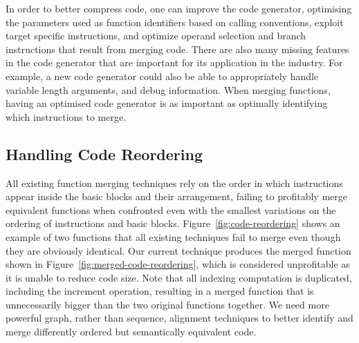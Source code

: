 
In order to better compress code, one can improve the code generator, optimising the parameters used as function identifiers based on calling conventions, exploit target specific instructions, and optimize operand selection and branch instructions that result from merging code.
There are also many missing features in the code generator that are important for its application in the industry.
For example, a new code generator could also be able to appropriately handle variable length arguments, and debug information.
When merging functions, having an optimised code generator is as important as optimally identifying which instructions to merge.

\subsection{Handling Code Reordering}

All existing function merging techniques rely on the order in which instructions appear inside the basic blocks and their arrangement,
failing to profitably merge equivalent functions when confronted even with the smallest variations on the ordering of instructions and basic blocks.
Figure~\ref{fig:code-reordering} shows an example of two functions that all existing techniques fail to merge even though they are obviously identical.
Our current technique produces the merged function shown in Figure~\ref{fig:merged-code-reordering}, which is considered unprofitable as it is unable to reduce code size.
Note that all indexing computation is duplicated, including the increment operation, resulting in a merged function that is unnecessarily bigger than the two original functions together.
We need more powerful graph, rather than sequence, alignment techniques to better identify and merge differently ordered but semantically equivalent code.

